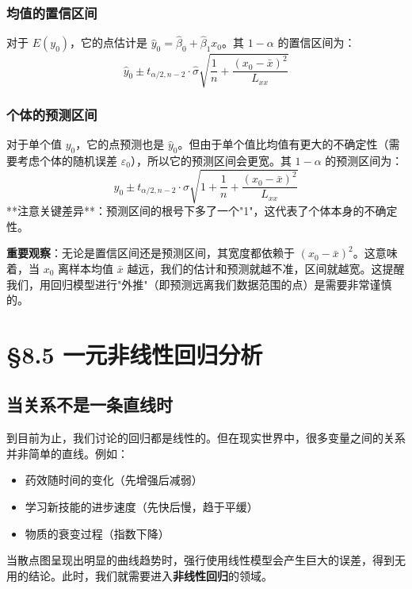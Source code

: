 \documentclass[12pt, a4paper]{amsart}
\begin{document}
\subsubsection{均值的置信区间}
对于 $E(y_0)$，它的点估计是 $\hat{y}_0 = \hat{\beta}_0 + \hat{\beta}_1 x_0$。其 $1-\alpha$ 的置信区间为：
$$ \hat{y}_0 \pm t_{\alpha/2, n-2} \cdot \hat{\sigma} \sqrt{\frac{1}{n} + \frac{(x_0 - \bar{x})^2}{L_{xx}}} $$

\subsubsection{个体的预测区间}
对于单个值 $y_0$，它的点预测也是 $\hat{y}_0$。但由于单个值比均值有更大的不确定性（需要考虑个体的随机误差 $\varepsilon_0$），所以它的预测区间会更宽。其 $1-\alpha$ 的预测区间为：
$$ \hat{y}_0 \pm t_{\alpha/2, n-2} \cdot \hat{\sigma} \sqrt{1 + \frac{1}{n} + \frac{(x_0 - \bar{x})^2}{L_{xx}}} $$
**注意关键差异**：预测区间的根号下多了一个"1"，这代表了个体本身的不确定性。

\textbf{重要观察}：无论是置信区间还是预测区间，其宽度都依赖于 $(x_0 - \bar{x})^2$。这意味着，当 $x_0$ 离样本均值 $\bar{x}$ 越远，我们的估计和预测就越不准，区间就越宽。这提醒我们，用回归模型进行"外推"（即预测远离我们数据范围的点）是需要非常谨慎的。

\section{§8.5 一元非线性回归分析}
\subsection{当关系不是一条直线时}
到目前为止，我们讨论的回归都是线性的。但在现实世界中，很多变量之间的关系并非简单的直线。例如：
\begin{itemize}
    \item 药效随时间的变化（先增强后减弱）
    \item 学习新技能的进步速度（先快后慢，趋于平缓）
    \item 物质的衰变过程（指数下降）
\end{itemize}
当散点图呈现出明显的曲线趋势时，强行使用线性模型会产生巨大的误差，得到无用的结论。此时，我们就需要进入\textbf{非线性回归}的领域。
\end{document}
